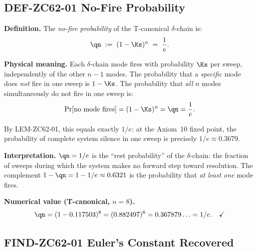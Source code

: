 \documentclass[12pt, a4paper]{article}
\begin{document}
\subsection{DEF-ZC62-01 \quad No-Fire Probability}
\label{sec:def01}


\begin{formalbox}[title={DEF-ZC62-01: No-Fire Probability
  $\qn := (1-\Ks)^n = 1/e$ ($R_0$)}]

\textbf{Definition.}
The \emph{no-fire probability} of the T-canonical $\delta$-chain
is:
\begin{equation}
  \qn \;:=\; (1-\Ks)^n \;=\; \frac{1}{e}.
  \label{eq:qn}
\end{equation}

\textbf{Physical meaning.}
Each $\delta$-chain mode fires with probability $\Ks$ per
sweep, independently of the other $n-1$ modes.
The probability that a \emph{specific} mode does \emph{not}
fire in one sweep is $1-\Ks$.
The probability that \emph{all} $n$ modes simultaneously
do not fire in one sweep is:
\[
  \Pr[\text{no mode fires}]
  = (1-\Ks)^n = \qn = \frac{1}{e}.
\]

By LEM-ZC62-01, this equals exactly $1/e$: at the Axiom~10
fixed point, the probability of complete system silence in one
sweep is precisely $1/e \approx 0.3679$.

\textbf{Interpretation.}
$\qn = 1/e$ is the ``rest probability'' of the $\delta$-chain:
the fraction of sweeps during which the system makes no
forward step toward resolution.
The complement $1 - \qn = 1 - 1/e \approx 0.6321$ is the
probability that \emph{at least one} mode fires.

\textbf{Numerical value (T-canonical, $n=8$).}
\[
  \qn = (1 - 0.117503)^8
      = (0.882497)^8
      = 0.367879\ldots
      = 1/e. \quad\checkmark
\]
\end{formalbox}

\subsection{FIND-ZC62-01 \quad Euler's Constant Recovered}
\label{sec:find01}

\end{document}
